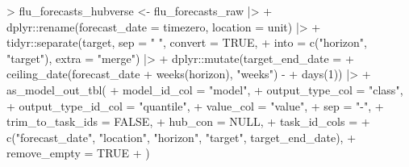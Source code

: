 \documentclass[
  letterpaper,
  DIV=11,
  numbers=noendperiod]{scrartcl}
\newenvironment{Shaded}{\begin{snugshade}}{\end{snugshade}}
\newcommand{\AttributeTok}[1]{\textcolor[rgb]{0.40,0.45,0.13}{#1}}
\newcommand{\ConstantTok}[1]{\textcolor[rgb]{0.56,0.35,0.01}{#1}}
\newcommand{\DecValTok}[1]{\textcolor[rgb]{0.68,0.00,0.00}{#1}}
\newcommand{\FunctionTok}[1]{\textcolor[rgb]{0.28,0.35,0.67}{#1}}
\newcommand{\NormalTok}[1]{\textcolor[rgb]{0.00,0.23,0.31}{#1}}
\newcommand{\OtherTok}[1]{\textcolor[rgb]{0.00,0.23,0.31}{#1}}
\newcommand{\SpecialCharTok}[1]{\textcolor[rgb]{0.37,0.37,0.37}{#1}}
\newcommand{\StringTok}[1]{\textcolor[rgb]{0.13,0.47,0.30}{#1}}
\begin{document}
\begin{Shaded}
\begin{Highlighting}[]
\SpecialCharTok{\textgreater{}}\NormalTok{ flu\_forecasts\_hubverse }\OtherTok{\textless{}{-}}\NormalTok{ flu\_forecasts\_raw }\SpecialCharTok{|\textgreater{}}
\SpecialCharTok{+}\NormalTok{   dplyr}\SpecialCharTok{::}\FunctionTok{rename}\NormalTok{(}\AttributeTok{forecast\_date =}\NormalTok{ timezero, }\AttributeTok{location =}\NormalTok{ unit) }\SpecialCharTok{|\textgreater{}}
\SpecialCharTok{+}\NormalTok{   tidyr}\SpecialCharTok{::}\FunctionTok{separate}\NormalTok{(target, }\AttributeTok{sep =} \StringTok{" "}\NormalTok{, }\AttributeTok{convert =} \ConstantTok{TRUE}\NormalTok{,}
\SpecialCharTok{+}                   \AttributeTok{into =} \FunctionTok{c}\NormalTok{(}\StringTok{"horizon"}\NormalTok{, }\StringTok{"target"}\NormalTok{), }\AttributeTok{extra =} \StringTok{"merge"}\NormalTok{) }\SpecialCharTok{|\textgreater{}}
\SpecialCharTok{+}\NormalTok{   dplyr}\SpecialCharTok{::}\FunctionTok{mutate}\NormalTok{(}\AttributeTok{target\_end\_date =} 
\SpecialCharTok{+}                   \FunctionTok{ceiling\_date}\NormalTok{(forecast\_date }\SpecialCharTok{+} \FunctionTok{weeks}\NormalTok{(horizon), }\StringTok{"weeks"}\NormalTok{) }\SpecialCharTok{{-}}
\SpecialCharTok{+}                     \FunctionTok{days}\NormalTok{(}\DecValTok{1}\NormalTok{)) }\SpecialCharTok{|\textgreater{}}
\SpecialCharTok{+}   \FunctionTok{as\_model\_out\_tbl}\NormalTok{(}
\SpecialCharTok{+}     \AttributeTok{model\_id\_col =} \StringTok{"model"}\NormalTok{,}
\SpecialCharTok{+}     \AttributeTok{output\_type\_col =} \StringTok{"class"}\NormalTok{,}
\SpecialCharTok{+}     \AttributeTok{output\_type\_id\_col =} \StringTok{"quantile"}\NormalTok{,}
\SpecialCharTok{+}     \AttributeTok{value\_col =} \StringTok{"value"}\NormalTok{,}
\SpecialCharTok{+}     \AttributeTok{sep =} \StringTok{"{-}"}\NormalTok{,}
\SpecialCharTok{+}     \AttributeTok{trim\_to\_task\_ids =} \ConstantTok{FALSE}\NormalTok{,}
\SpecialCharTok{+}     \AttributeTok{hub\_con =} \ConstantTok{NULL}\NormalTok{,}
\SpecialCharTok{+}     \AttributeTok{task\_id\_cols =} 
\SpecialCharTok{+}       \FunctionTok{c}\NormalTok{(}\StringTok{"forecast\_date"}\NormalTok{, }\StringTok{"location"}\NormalTok{, }\StringTok{"horizon"}\NormalTok{, }\StringTok{"target"}\NormalTok{, target\_end\_date),}
\SpecialCharTok{+}     \AttributeTok{remove\_empty =} \ConstantTok{TRUE}
\SpecialCharTok{+}\NormalTok{   )}
\end{Highlighting}
\end{Shaded}
\end{document}
